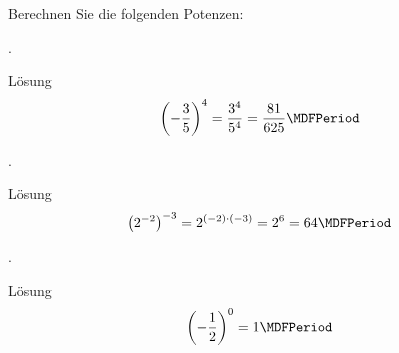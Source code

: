 \begin{MExercises}

\begin{MExercise}
Berechnen Sie die folgenden Potenzen:
\begin{MExerciseItems}
\item{.\\\begin{MHint}{Lösung} $$\left(-\Mdfrac{3}{5}\right)^4=\Mdfrac{3^4}{5^4}=\Mdfrac{81}{625} \MDFPeriod$$\end{MHint}}
\item{.\\\begin{MHint}{Lösung} $$\left(2^{-2}\right)^{-3}=2^{(-2)\cdot(-3)}=2^6=64 \MDFPeriod$$\end{MHint}}
\item{.\\\begin{MHint}{Lösung} $$\left(-\Mdfrac{1}{2}\right)^0=1 \MDFPeriod$$\end{MHint}}
\end{MExerciseItems}
\end{MExercise}


\end{MExercises}
